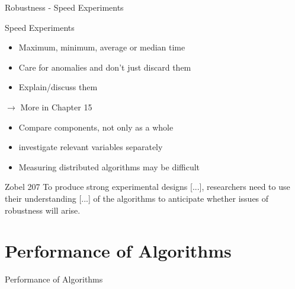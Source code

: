 \documentclass{beamer}
\begin{document}
\begin{frame}{Robustness - Speed Experiments}
\begin{block}{Speed Experiments}
\begin{itemize}
\item Maximum, minimum, average or median time 
\item Care for anomalies and don't just discard them
\item Explain/discuss them
\end{itemize}
$\rightarrow$ More in Chapter 15
\end{block}

\end{frame}

\begin{frame}
\begin{itemize}
\item Compare components, not only as a whole
\item investigate relevant variables separately
\item Measuring distributed algorithms may be difficult 
\end{itemize}
\begin{block}{Zobel 207}
To produce strong experimental designs [...], researchers need to use their understanding [...] of the algorithms to
anticipate whether issues of robustness will arise.
\end{block}

\end{frame}

\section{Performance of Algorithms}
\begin{frame}{Performance of Algorithms}

\end{frame}
\end{document}
